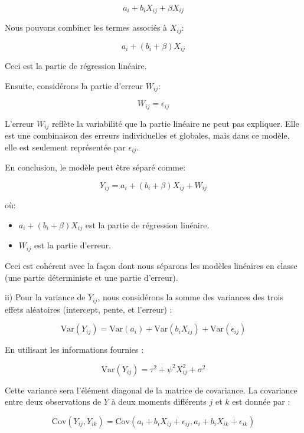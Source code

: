 \documentclass[../main.tex]{subfiles}
\begin{document}
\begin{CJK*}{UTF8}{gbsn}
\[
a_i + b_i X_{ij} + \beta X_{ij}
\]

Nous pouvons combiner les termes associés à \(X_{ij}\):

\[
a_i + (b_i + \beta) X_{ij}
\]

Ceci est la partie de régression linéaire.

Ensuite, considérons la partie d'erreur \(W_{ij}\):

\[
W_{ij} = \epsilon_{ij}
\]

L'erreur \(W_{ij}\) reflète la variabilité que la partie linéaire ne peut pas expliquer. Elle est une combinaison des erreurs individuelles et globales, mais dans ce modèle, elle est seulement représentée par \(\epsilon_{ij}\).

En conclusion, le modèle peut être séparé comme:

\[
Y_{ij} = a_i + (b_i + \beta) X_{ij} + W_{ij}
\]

où:
\begin{itemize}
    \item \(a_i + (b_i + \beta) X_{ij}\) est la partie de régression linéaire.
    \item \(W_{ij}\) est la partie d'erreur.
\end{itemize}

Ceci est cohérent avec la façon dont nous séparons les modèles linéaires en classe (une partie déterministe et une partie d'erreur).

ii) Pour la variance de \( Y_{ij} \), nous considérons la somme des variances des trois effets aléatoires (intercept, pente, et l'erreur) :

\begin{equation*}
\text{Var}(Y_{ij}) = \text{Var}(a_i) + \text{Var}(b_i X_{ij}) + \text{Var}(\epsilon_{ij})
\end{equation*}

En utilisant les informations fournies :

\begin{equation*}
\text{Var}(Y_{ij}) = \tau^2 + \psi^2 X_{ij}^2 + \sigma^2
\end{equation*}

Cette variance sera l'élément diagonal de la matrice de covariance.
La covariance entre deux observations de \( Y \) à deux moments différents \( j \) et \( k \) est donnée par :

\begin{equation*}
\text{Cov}(Y_{ij}, Y_{ik}) = \text{Cov}(a_i + b_i X_{ij} + \epsilon_{ij}, a_i + b_i X_{ik} + \epsilon_{ik})
\end{equation*}


\end{CJK*}
\end{document}

